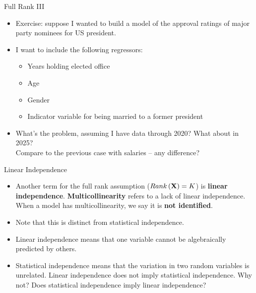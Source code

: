 \begin{frame}{Full Rank III}
\begin{itemize}

	\item Exercise: suppose I wanted to build a model of the approval ratings of major party nominees 
	for US president. 

	\item I want to include the following regressors:
	\begin{itemize}
		\item Years holding elected office
		\item Age
		\item Gender
		\item Indicator variable for being married to a former president
	\end{itemize}

	\item What's the problem, assuming I have data through 2020? What about in 2025? \\ Compare to the previous case with salaries -- any difference? 



\end{itemize}
\end{frame}

\begin{frame}{Linear Independence}
\begin{itemize}

	\item Another term for the full rank assumption ($Rank\left({\bf X}\right)=K$) is {\bf linear independence}.
	 {\bf Multicollinearity} refers to a lack of linear independence. When a model has multicollinearity, we 
  	say it is {\bf not identified}. 

	\medskip
	\item Note that this is distinct from statistical independence. 

	\medskip
	\item Linear independence means that one variable cannot be algebraically predicted by others. 

	\medskip
	\item Statistical independence means that the variation in two random variables is unrelated.
	Linear independence does not imply statistical independence. Why not? Does statistical independence
	imply linear independence? 
\end{itemize}
\end{frame}


